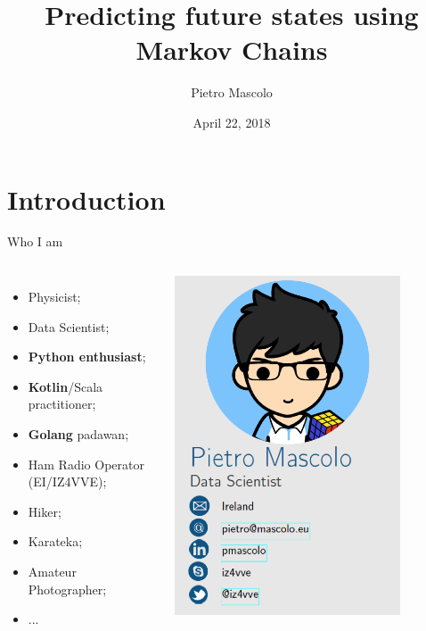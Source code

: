 \documentclass[10pt,notes]{beamer}
\author[PM]{Pietro Mascolo}
\title[Predicting the future]{Predicting future states using Markov Chains}
\institute[Optum]{\textbf{\Large{Optum Ireland Ltd.}}}
\date{\small{April 22, 2018}}
\begin{document}
	\begin{frame}
		\titlepage
	\end{frame}


	\section{Introduction}

	\begin{frame}{Who I am}
		\begin{columns}
			\begin{itemize}
   				\item Physicist;
   				\item Data Scientist;
   				\item \textbf{Python enthusiast};
   				\item \textbf{Kotlin}/Scala practitioner;
   				\item \textbf{Golang} padawan;
   				\item Ham Radio Operator (EI/IZ4VVE);
   				\item Hiker;
   				\item Karateka;
   				\item Amateur Photographer;
   				\item ...
			\end{itemize}
   			
   			\begin{center}
   				\includegraphics[width=0.8\textwidth]{imgs/me.png}
			\end{center}


\end{columns}
\end{frame}
\end{document}
